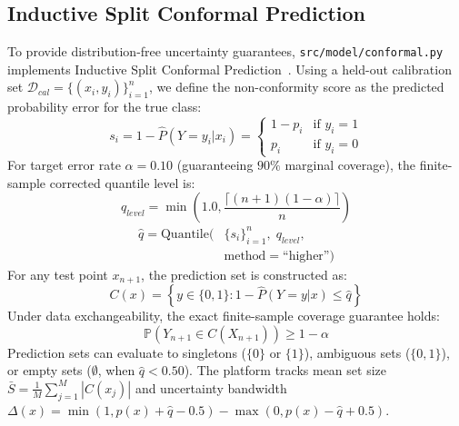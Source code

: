 \documentclass[conference]{IEEEtran}
\begin{document}
\subsection{Inductive Split Conformal Prediction}
To provide distribution-free uncertainty guarantees, \texttt{src/model/conformal.py} implements Inductive Split Conformal Prediction~\cite{angelopoulos2023conformal}. Using a held-out calibration set $\mathcal{D}_{cal} = \{(x_i, y_i)\}_{i=1}^n$, we define the non-conformity score as the predicted probability error for the true class:
\begin{equation}
s_i = 1 - \hat{P}(Y = y_i | x_i) = \begin{cases} 1 - p_i & \text{if } y_i = 1 \\ p_i & \text{if } y_i = 0 \end{cases}
\end{equation}
For target error rate $\alpha = 0.10$ (guaranteeing $90\%$ marginal coverage), the finite-sample corrected quantile level is:
\begin{equation}
q_{level} = \min\left( 1.0, \frac{\lceil (n + 1)(1 - \alpha) \rceil}{n} \right)
\end{equation}
\begin{equation}
\begin{aligned}
\hat{q} = \text{Quantile}\Big(&\{s_i\}_{i=1}^n,\; q_{level}, \\
&\text{method}=\text{``higher''}\Big)
\end{aligned}
\end{equation}
For any test point $x_{n+1}$, the prediction set is constructed as:
\begin{equation}
C(x) = \left\{ y \in \{0, 1\} : 1 - \hat{P}(Y = y | x) \le \hat{q} \right\}
\end{equation}
Under data exchangeability, the exact finite-sample coverage guarantee holds:
\begin{equation}
\mathbb{P}\left( Y_{n+1} \in C(X_{n+1}) \right) \ge 1 - \alpha
\end{equation}
Prediction sets can evaluate to singletons ($\{0\}$ or $\{1\}$), ambiguous sets ($\{0, 1\}$), or empty sets ($\emptyset$, when $\hat{q} < 0.50$). The platform tracks mean set size $\bar{S} = \frac{1}{M}\sum_{j=1}^M |C(x_j)|$ and uncertainty bandwidth $\Delta(x) = \min(1, p(x) + \hat{q} - 0.5) - \max(0, p(x) - \hat{q} + 0.5)$.
\end{document}
